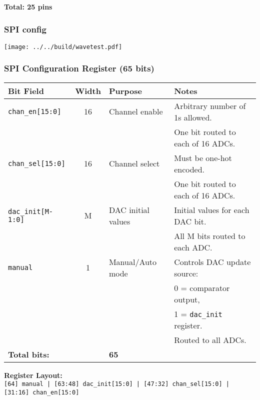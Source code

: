 \documentclass[aspectratio=169]{beamer}
\begin{document}
\begin{frame}
\begin{center}
    \vspace{0.3cm}
    \textbf{Total: 25 pins}
  \end{center}
\end{frame}

\begin{frame}
  \frametitle{SPI config}

    \texttt{[image: ../../build/wavetest.pdf]}

  \end{frame}

\begin{frame}
  \frametitle{SPI Configuration Register (65 bits)}
  \begin{center}
    \scriptsize
    \begin{tabular}{|l|c|l|l|}
    \hline
    \textbf{Bit Field} & \textbf{Width} & \textbf{Purpose} & \textbf{Notes} \\
    \hline
    \texttt{chan\_en[15:0]} & 16 & Channel enable & Arbitrary number of 1s allowed. \\
                            &    &                & One bit routed to each of 16 ADCs. \\
    \hline
    \texttt{chan\_sel[15:0]} & 16 & Channel select & Must be one-hot encoded. \\
                             &    &                & One bit routed to each of 16 ADCs. \\
    \hline
    \texttt{dac\_init[M-1:0]} & M & DAC initial values & Initial values for each DAC bit. \\
                             &    &                    & All M bits routed to each ADC. \\
    \hline
    \texttt{manual} & 1 & Manual/Auto mode & Controls DAC update source: \\
                    &   &                  & 0 = comparator output, \\
                    &   &                  & 1 = \texttt{dac\_init} register. \\
                    &   &                  & Routed to all ADCs. \\
    \hline
    \multicolumn{2}{|l|}{\textbf{Total bits:}} & \textbf{65} & \\
    \hline
    \end{tabular}
    
    \vspace{0.4cm}
    \textbf{Register Layout:} \\
    \texttt{[64] manual | [63:48] dac\_init[15:0] | [47:32] chan\_sel[15:0] | [31:16] chan\_en[15:0]}
  \end{center}
\end{frame}
\end{document}

